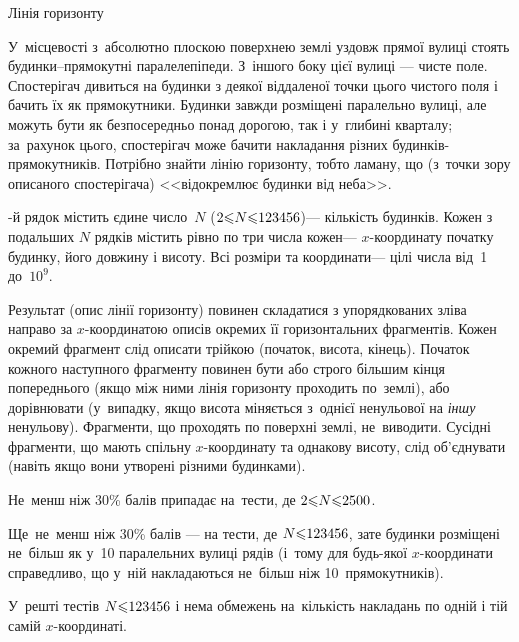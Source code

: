 ﻿\begin{problemAllDefault}{Лінія горизонту}

У~місцевості з~абсолютно плоскою поверхнею землі уздовж прямої вулиці стоять будинки--прямокутні паралелепіпеди. З~іншого боку цієї вулиці --- чисте поле. Спостерігач дивиться на будинки з деякої віддаленої точки цього чистого поля і бачить їх як прямокутники. Будинки завжди розміщені паралельно вулиці, але можуть бути як безпосередньо понад дорогою, так і у~глибині кварталу; за~рахунок цього, спостерігач може бачити накладання різних будинків-прямокутників. 
Потрібно знайти лінію горизонту, тобто ламану, що (з~точки зору описаного спостерігача) <<відокремлює будинки від неба>>.

-й рядок містить єдине число~$N$ ($2{\leqslant}N{\leqslant}123456$)\nolinebreak[3] --- кількість будинків. Кожен з подальших $N$ рядків містить рівно по три числа кожен\nolinebreak[3] --- \mbox{$x$-коор}\-ди\-нату початку будинку, його довжину і висоту. Всі розміри та координати\nolinebreak[3] --- цілі числа від~1 до~$10^9$.

\OutputFile
Результат (опис лінії горизонту) повинен складатися з упорядкованих зліва направо за $x$-координатою описів окремих її горизонтальних фрагментів. Кожен окремий фрагмент слід описати трійкою (початок, висота, кінець). Початок кожного наступного фрагменту повинен бути або строго більшим кінця попереднього (якщо між ними лінія горизонту проходить по~землі), або дорівнювати (у~випадку, якщо висота міняється з~однієї ненульової на \emph{іншу} ненульову). Фрагменти, що проходять по поверхні землі, не~виводити. Сусідні фрагменти, що мають спільну $x$-координату та однакову висоту, слід об'єднувати (навіть якщо вони утворені різними будинками).

\Scoring
Не~менш ніж 30\% балів припадає на~тести, де $2{\leqslant}N{\leqslant}2500$. 

Ще~не~менш ніж 30\% балів --- на тести, де $N{\leqslant}123456$, зате будинки розміщені не~більш як у~10 паралельних вулиці рядів (і~тому для будь-якої $x$-координати справедливо, що у~ній накладаються не~більш ніж 10~прямокутників). 

У~решті тестів $N{\leqslant}123456$ і нема обмежень на~кількість накладань по одній і тій самій $x$-координаті.

\Example

\begin{example}
%
\end{example}


\end{problemAllDefault}

